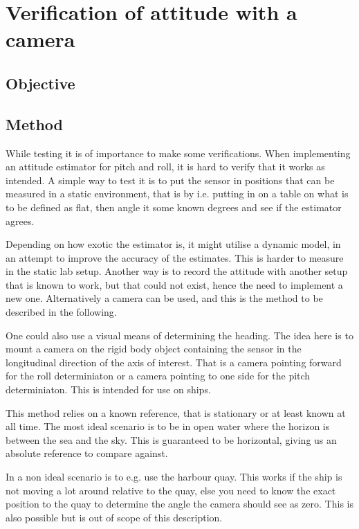 \chapter{Verification of attitude with a camera}

\section{Objective}
\section{Method}


While testing it is of importance to make some verifications. When implementing an attitude
estimator for pitch and roll, it is hard to verify that it works as
intended. A simple way to test it is to put the sensor in positions
that can be measured in a static environment, that is by i.e. putting
in on a table on what is to be defined as flat, then angle it
some known degrees and see if the estimator agrees.

Depending on how exotic the estimator is, it might utilise a dynamic
model, in an attempt to improve the accuracy of the estimates. This is
harder to measure in the static lab setup. Another way is to record
the attitude with another setup that is known to work, but that could
not exist, hence the need to implement a new one. Alternatively a
camera can be used, and this is the method to be described in the
following.

One could also use a visual means of determining the heading. The idea
here is to mount a camera on the rigid body object containing the
sensor in the longitudinal direction of the axis of interest. That is
a camera pointing forward for the roll determiniaton or a camera
pointing to one side for the pitch determiniaton. This is intended for
use on ships.

This method relies on a known reference, that is stationary or at least
known at all time. The most ideal scenario is to be in open water
where the horizon is between the sea and the sky. This is guaranteed
to be horizontal, giving us an absolute reference to compare against.

In a non ideal scenario is to e.g. use the harbour quay. This works if
the ship is not moving a lot around relative to the quay, else you
need to know the exact position to the quay to determine the angle the
camera should see as zero. This is also possible but is out of scope
of this description.

